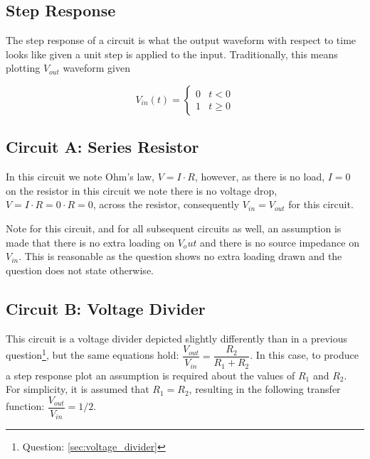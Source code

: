 \documentclass[main.tex]{subfiles}
\begin{document}
\subsection{Step Response}
The step response of a circuit is what the output waveform with respect to time looks like given a unit step is applied to the input. Traditionally, this means plotting $V_{out}$ waveform given 

\[ V_{in}(t) = \begin{cases} 0 & t < 0 \\ 1 & t \geq 0 \end{cases} \]


\subsection{Circuit A: Series Resistor}
In this circuit we note Ohm's law, $V = I \cdot R$, however, as there is no load, $I=0$ on the resistor in this circuit we note there is no voltage drop, $V=I \cdot R=0 \cdot R=0$, across the resistor, consequently $V_{in} = V_{out}$ for this circuit. \newline

\newnoindentpara Note for this circuit, and for all subsequent circuits as well, an assumption is made that there is no extra loading on $V_out$ and there is no source impedance on $V_{in}$. This is reasonable as the question shows no extra loading drawn and the question does not state otherwise.

\subsection{Circuit B: Voltage Divider}
This circuit is a voltage divider depicted slightly differently than in a previous question\footnote{Question: \ref{sec:voltage_divider}}, but the same equations hold: $\dfrac{V_{out}}{V_{in}} = \dfrac{R_2}{R_1 + R_2}$. In this case, to produce a step response plot an assumption is required about the values of $R_1$ and $R_2$. For simplicity, it is assumed that $R_1 = R_2$, resulting in the following transfer function: $\dfrac{V_{out}}{V_{in}} = 1/2$.
\end{document}
